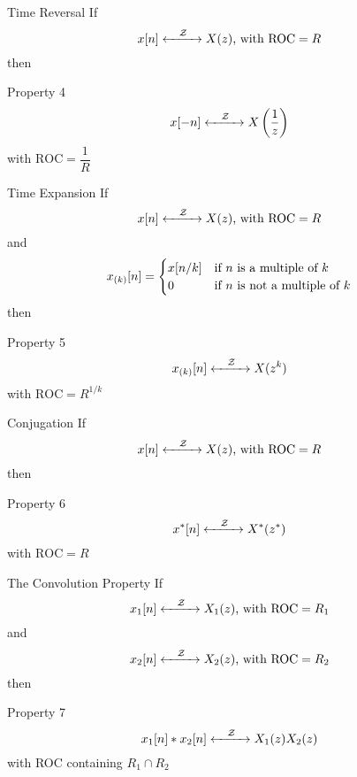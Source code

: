 \documentclass[aspectratio=169]{beamer}
\begin{document}
\begin{frame}{Time Reversal}
	If\\
	\[x[n] \xleftrightarrow[]{\quad\mathcal{Z}\quad} X(z) \text{, with } \mathrm{ROC} =R\]
	then
	\begin{block}{Property 4}
		\[ x[-n] \xleftrightarrow[]{\quad\mathcal{Z}\quad} X\left(\frac{1}{z}\right) \]
		\centering
		with $\mathrm{ROC} = \dfrac{1}{R} $
	\end{block}
\end{frame}

\begin{frame}{Time Expansion}
	If\\
	\[x[n] \xleftrightarrow[]{\quad\mathcal{Z}\quad} X(z) \text{, with } \mathrm{ROC} =R\]
	and
	\[x_{(k)}[n]=\begin{cases}
	x[n/k] & \text{if $ n $ is a multiple of $ k $}\\
	0 & \text{if $ n $ is not a multiple of $ k $}\\
	\end{cases}\]
	then
	\begin{block}{Property 5}
		\[ x_{(k)}[n] \xleftrightarrow[]{\quad\mathcal{Z}\quad} X(z^k) \]
		\centering
		with $\mathrm{ROC} = R^{1/k} $
	\end{block}
\end{frame}

\begin{frame}{Conjugation}
	If\\
	\[x[n] \xleftrightarrow[]{\quad\mathcal{Z}\quad} X(z) \text{, with } \mathrm{ROC} =R\]
	then
	\begin{block}{Property 6}
		\[ x^*[n] \xleftrightarrow[]{\quad\mathcal{Z}\quad} X^*(z^*) \]
		\centering
		with $\mathrm{ROC} = R $
	\end{block}
\end{frame}

\begin{frame}{The Convolution Property}
	If\\
	\[x_1[n] \xleftrightarrow[]{\quad\mathcal{Z}\quad} X_1(z) \text{, with } \mathrm{ROC} =R_1\]
	and\\
	\[ x_2[n] \xleftrightarrow[]{\quad\mathcal{Z}\quad} X_2(z) \text{, with   } \mathrm{ROC} =R_2 \]
	then
	\begin{block}{Property 7}
		\[ x_1[n]*x_2[n] \xleftrightarrow[]{\quad\mathcal{Z}\quad} X_1(z)X_2(z) \]
		\centering
		with ROC containing  $ R_1\cap R_2 $ 	
	\end{block}
\end{frame}
\end{document}
